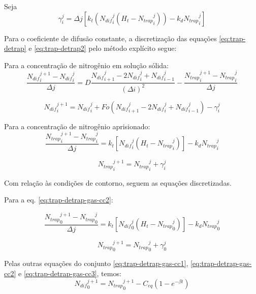 Seja 
\begin{equation*}
\gamma_i^j = {\Delta j}\left[k_t\left({N_{dif}}_{i}^{j} \left(H_t-{N_{trap}}_{i}^{j}\right)\right) - k_d{N_{trap}}_i^{j}\right]
\end{equation*}

Para o coeficiente de difusão constante, a discretização das equações \autoref{eq:trap-detrap} e \autoref{eq:trap-detrap2} pelo método explícito segue:

Para a concentração de nitrogênio em solução sólida:
\begin{equation*}
\dfrac{{N_{dif}}_{i}^{j+1} - {N_{dif}}_{i}^{j}}{\Delta j} = D \dfrac{{N_{dif}}_{i+1}^{j} - 2{N_{dif}}_i^{j} + {N_{dif}}_{i-1}^{j}}{(\Delta i)^2} - \dfrac{{N_{trap}}_i^{j+1} - {N_{trap}}_{i}^{j}}{\Delta j}
\end{equation*} 

\begin{equation}
\label{eq:trap-detrap-discr2}
{N_{dif}}_{i}^{j+1} = {N_{dif}}_{i}^{j} + Fo({N_{dif}}_{i+1}^{j} - 2{N_{dif}}_i^{j} + {N_{dif}}_{i-1}^{j}) - \gamma_i^j
\end{equation} 


Para a concentração de nitrogênio aprisionado:
\begin{equation*}
\dfrac{{N_{trap}}_i^{j+1} - {N_{trap}}_{i}^{j}}{\Delta j} = k_t\left[{N_{dif}}_{i}^{j} \left(H_t-{N_{trap}}_{i}^{j}\right)\right] - k_d{N_{trap}}_i^{j}
\end{equation*}


\begin{equation}
\label{eq:trap-detrap2-discr2}
{N_{trap}}_i^{j+1} = {N_{trap}}_{i}^{j} + \gamma_i^j
\end{equation}

Com relação às condições de contorno, seguem as equações discretizadas.

Para a eq. \ref{eq:trap-detrap-gas-cc2}:

\begin{equation*}
\dfrac{{N_{trap}}_0^{j+1} - {N_{trap}}_{0}^{j}}{\Delta j} = k_t\left[{N_{dif}}_{0}^{j} \left(H_t-{N_{trap}}_{0}^{j}\right)\right] - k_d{N_{trap}}_0^{j}
\end{equation*} 

\begin{equation}
\label{eq:trap-detrap2-discr3}
{N_{trap}}_0^{j+1} = {N_{trap}}_{0}^{j} + \gamma_0^j
\end{equation}

Pelas outras equações do conjunto \ref{eq:trap-detrap-gas-cc1}, \ref{eq:trap-detrap-gas-cc2} e \ref{eq:trap-detrap-gas-cc3}, temos:
\begin{equation}
\label{eq:trap-detrap2-discr4}
{N_{dif}}_0^{j+1} = {N_{trap}}_{0}^{j+1} - C_{eq}(1 - e^{-\beta t})
\end{equation}

